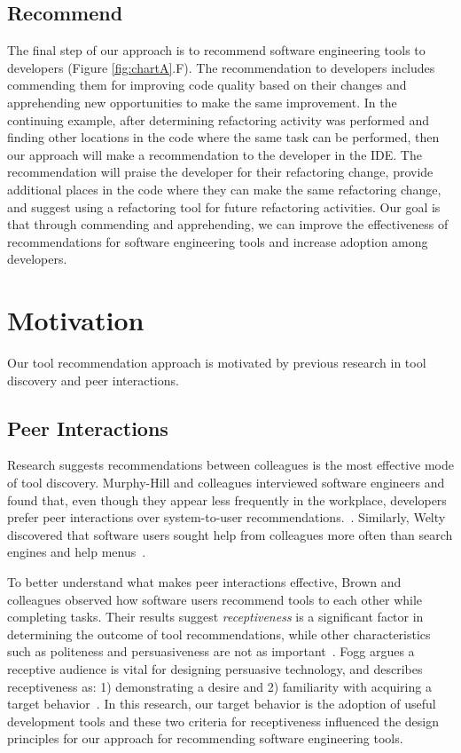 \documentclass[sigconf,review,anonymous]{acmart}
\begin{document}

\subsection{Recommend}

The final step of our approach is to recommend software engineering tools to developers  (Figure \ref{fig:chartA}.F). The recommendation to developers includes commending them for improving code quality based on their changes and apprehending new opportunities to make the same improvement. In the continuing example, after determining refactoring activity was performed and finding other locations in the code where the same task can be performed, then our approach will make a recommendation to the developer in the IDE. The recommendation will praise the developer for their refactoring change, provide additional places in the code where they can make the same refactoring change, and suggest using a refactoring tool for future refactoring activities. Our goal is that through commending and apprehending, we can improve the effectiveness of recommendations for software engineering tools and increase adoption among developers. 

\section{Motivation}

Our tool recommendation approach is motivated by previous research in tool discovery and peer interactions.

\subsection{Peer Interactions}

Research suggests recommendations between colleagues is the most effective mode of tool discovery. Murphy-Hill and colleagues interviewed software engineers and found that, even though they appear less frequently in the workplace, developers prefer peer interactions over system-to-user recommendations.~\cite{Murphy-Hill2011PeerInteraction}. Similarly, Welty discovered that software users sought help from colleagues more often than search engines and help menus~\cite{Welty2011Help}. 

To better understand what makes peer interactions effective, Brown and colleagues observed how software users recommend tools to each other while completing tasks. Their results suggest \emph{receptiveness} is a significant factor in determining the outcome of tool recommendations, while other characteristics such as politeness and persuasiveness are not as important~\cite{vlhcc17}. Fogg argues a receptive audience is vital for designing persuasive technology, and describes receptiveness as: 1) demonstrating a desire and 2) familiarity with acquiring a target behavior~\cite{FoggPersuasive}. In this research, our target behavior is the adoption of useful development tools and these two criteria for receptiveness influenced the design principles for our approach for recommending software engineering tools.
\end{document}
